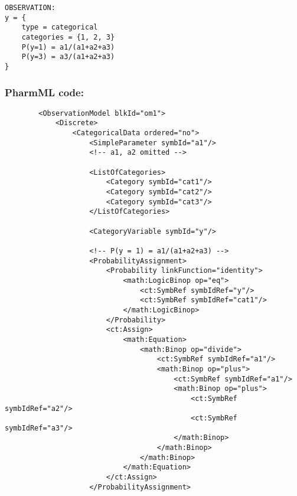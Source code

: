\begin{lstlisting}
OBSERVATION:
y = { 
	type = categorical 
	categories = {1, 2, 3} 
	P(y=1) = a1/(a1+a2+a3) 
	P(y=3) = a3/(a1+a2+a3) 
}
\end{lstlisting}

\subsubsection{PharmML code:}

\lstset{language=XML}
\begin{lstlisting}
        <ObservationModel blkId="om1">
            <Discrete>
                <CategoricalData ordered="no">
                    <SimpleParameter symbId="a1"/>
                    <!-- a1, a2 omitted -->
                    
                    <ListOfCategories> 
                        <Category symbId="cat1"/>
                        <Category symbId="cat2"/>
                        <Category symbId="cat3"/>
                    </ListOfCategories>
                    
                    <CategoryVariable symbId="y"/>
                    
                    <!-- P(y = 1) = a1/(a1+a2+a3) -->
                    <ProbabilityAssignment>
                        <Probability linkFunction="identity">
                            <math:LogicBinop op="eq">
                                <ct:SymbRef symbIdRef="y"/>
                                <ct:SymbRef symbIdRef="cat1"/>
                            </math:LogicBinop>
                        </Probability>
                        <ct:Assign>
                            <math:Equation>
                                <math:Binop op="divide">
                                    <ct:SymbRef symbIdRef="a1"/>
                                    <math:Binop op="plus">
                                        <ct:SymbRef symbIdRef="a1"/>
                                        <math:Binop op="plus">
                                            <ct:SymbRef symbIdRef="a2"/>
                                            <ct:SymbRef symbIdRef="a3"/>
                                        </math:Binop>
                                    </math:Binop>
                                </math:Binop>
                            </math:Equation>
                        </ct:Assign>
                    </ProbabilityAssignment>
                    

\end{lstlisting}
